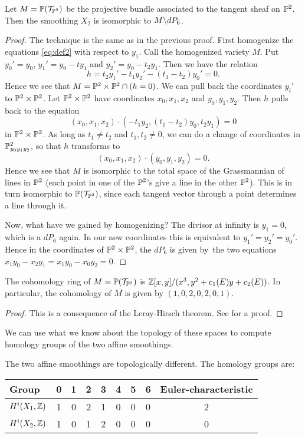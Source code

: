 \begin{lemma}
Let $M=\mathbb{P}(\mathcal T_ {\mathbb{P}^2})$ be the projective bundle associated to the tangent sheaf on $\mathbb{P}^2$. Then the smoothing $X_2$ is isomorphic to $M \backslash dP_6$. 
\end{lemma}
\begin{proof}
The technique is the same as in the previous proof. First homogenize the equations \eqref{eq:def2} with respect to $y_1$. Call the homogenized variety $M$. Put $y_0'=y_0$, $y_1' = y_0-ty_1$ and $y_2'=y_0-t_2y_1$. Then we have the relation
\[
h = t_2y_1'-t_1y_2' - (t_1-t_2)y_0' = 0.
\]
Hence we see that $M=\mathbb{P}^2 \times \mathbb{P}^2 \cap (h = 0)$. We can pull back the coordinates $y_i'$ to $\mathbb{P}^2 \times \mathbb{P}^2$. Let $\mathbb{P}^2 \times \mathbb{P}^2$ have coordinates $x_0,x_1,x_2$ and $y_0,y_1,y_2$. Then $h$ pulls back to the equation
\[
(x_0,x_1,x_2) \cdot (-t_1y_2, (t_1-t_2)y_0,t_2y_1) = 0
\]
in $\mathbb{P}^2 \times \mathbb{P}^2$. As long as $t_1 \neq t_2$ and $t_1,t_2 \neq 0$, we can do a change of coordinates in $\mathbb{P}^2_{y_0y_1y_2}$, so that $h$ transforms to
\[
(x_0,x_1,x_2) \cdot(y_0,y_1,y_2) = 0.
\]
Hence we see that $M$ is isomorphic to the total space of the Grassmannian of lines in $\mathbb{P}^2$ (each point in one of the $\mathbb{P}^2$'s give a line in the other $\mathbb{P}^2$). This is in turn isomorphic to $\mathbb{P}(\mathcal T_{\mathbb{P}^2})$, since each tangent vector through a point determines a line through it.

Now, what have we gained by homogenizing? The divisor at infinity is $y_1=0$, which is a $dP_6$ again. In our new coordinates this is equivalent to $y_1'=y_2'=y_0'$. Hence in the coordinates of $\mathbb{P}^2 \times \mathbb{P}^2$, the $dP_6$ is given by the two equations $x_1y_0-x_2y_1=x_1y_0-x_0y_2=0$. 
\end{proof}

\begin{lemma}
The cohomology ring of $M=\mathbb{P}(\mathcal T_{\mathbb{P}^2})$ is $\mathbb{Z}[x,y]/(x^3,y^2+c_1(E)y+c_2(E))$. In particular, the cohomology of $M$ is given by $(1,0,2,0,2,0,1)$.
\end{lemma}
\begin{proof}
This is a consequence of the Leray-Hirsch theorem. See \cite{bott_tu} for a proof.
\end{proof}

We can use what we know about the topology of these spaces to compute homology groups of the two affine smoothings.

\begin{thm}
The two affine smoothings are topologically different. The homology groups are:
\begin{center}
\begin{tabular}{ l || c | c | c | c | c | c | c || c }
 Group & 0 & 1 & 2 & 3 & 4 & 5 & 6 & Euler-characteristic \\
\hline
$H^i(X_1,\mathbb{Z})$ & 1 & 0 & 2 & 1 & 0 & 0 & 0 & 2 \\
$H^i(X_2,\mathbb{Z})$ & 1 & 0 & 1 & 2 & 0 & 0 & 0  & 0
\end{tabular}
\end{center}
\end{thm}

